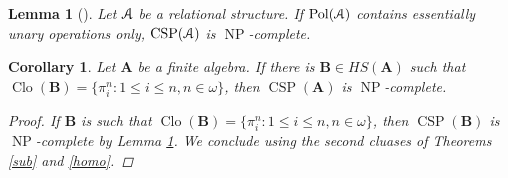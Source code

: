 \documentclass{amsart}
\theoremstyle{plain}
\newtheorem{corollary}[theorem]{Corollary}
\newtheorem{lemma}[theorem]{Lemma}
\theoremstyle{definition}
\theoremstyle{remark}
\DeclareMathOperator{\Clo}{Clo}
\DeclareMathOperator{\CSP}{CSP}
\DeclareMathOperator{\Pol}{Pol}
\DeclareMathOperator{\NP}{NP}
\begin{document}
\begin{lemma} [\cite{jeavons}]
    \label{ess-unary}
    Let $\EuScript{A}$ be a relational structure. 
    If $\Pol(\EuScript{A})$ contains essentially unary operations only, $\CSP(\EuScript{A})$ is $\NP$-complete. 
\end{lemma}

\begin{corollary}
    Let $\mathbf{A}$ be a finite 
    algebra. 
    If there is $\mathbf{B} \in HS(\mathbf{A})$ such that $\Clo(\mathbf{B}) = \{\pi^n_i: 1 \le i \le n, n \in \omega\}$, then 
    $\CSP(\mathbf{A})$ is $\NP$-complete. 
    \begin{proof}
        If $\mathbf{B}$ is such that $\Clo(\mathbf{B}) = \{\pi^n_i: 1 \le i \le n, n \in \omega\}$, then $\CSP(\mathbf{B})$ is $\NP$-complete by Lemma \ref{ess-unary}. 
        We conclude using the second cluases of Theorems \ref{sub} and \ref{homo}. 
   \end{proof}
\end{corollary}
\end{document}
